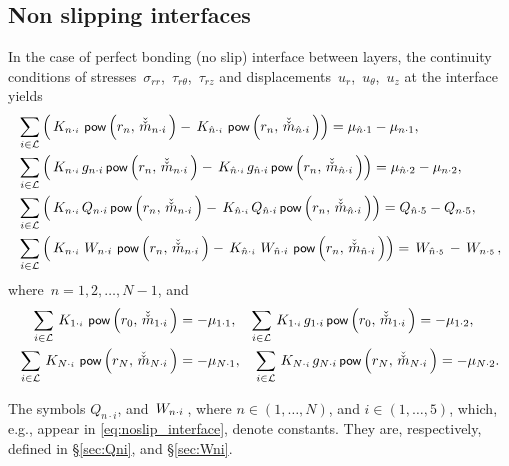 \documentclass[preprint,12pt,times]{elsarticle}
\newcommand{\plus}[1]{\hat{#1}}
\newcommand{\minus}[1]{\check{#1}}
\newcommand{\minusminus}[1]{\minus{\minus{#1}}}
\numberwithin{equation}{section}
\newcommand{\pr}[1]{\left( #1 \right)}
\newcommand{\p}{\,\textsf{\small pow}}
\newcommand{\msubmm}[2]{
\IfEqCase{#2}{
      {i}{\, \minusminus{m}_{#1\cdot #2}\,}%
  }[\,\minusminus{m}_{#1\cdot {\scriptscriptstyle #2}}\,]}
\newcommand{\gsub}[2]{g_{#1\cdot #2}}
\newcommand{\Qsub}[2]{Q_{#1\cdot #2}}
\newcommand{\Wsub}[2]{
\IfEqCase{#2}{
      {i}{\, W_{#1\cdot #2}\,}%
  }[\,W_{#1\cdot {\scriptscriptstyle #2}}\,]}
\newcommand{\musub}[2]{\mu_{#1\cdot #2}}
\newcommand{\Ksub}[2]{\,K_{ {#1}\cdot {\scriptscriptstyle #2}}\,}
\newcommand{\infive}{\in(1,\ldots,5)}
\newcommand{\inN}{\in(1,\ldots,N)}
\renewcommand{\>}{$\Rightarrow$}
\begin{document}
\subsection{Non slipping interfaces}

In the case of perfect bonding (no slip) interface between layers, the continuity conditions of stresses~$\sigma_{rr}$,~$\tau_{r\theta}$,~$\tau_{rz}$ and displacements~$u_{r}$,~$u_{\theta}$,~$u_z$ at the interface yields
\begin{subequations}
	\begin{align}
	& \sum_{i \in \mathcal{L}} \left( \Ksub{n}{i} \p\pr{r_{n},\msubmm{n}{i}} - \Ksub{\plus{n}}{i} \p\pr{r_{n},\msubmm{\plus{n}}{i}} \right) = \musub{\plus{n}}{1}
  - \musub{n}{1}, \\
	& \sum_{i \in \mathcal{L}} \left( \Ksub{n}{i} \gsub{n}{i} \p\pr{r_{n},\msubmm{n}{i}} - \Ksub{\plus{n}}{i} \gsub{\plus{n}}{i} \p\pr{r_{n},\msubmm{\plus{n}}{i}} \right) = \musub{\plus{n}}{2} - \musub{n}{2}, \\
	& \sum_{i \in \mathcal{L}} \left( \Ksub{n}{i} \Qsub{n}{i} \p\pr{r_{n},\msubmm{n}{i}} - \Ksub{\plus{n}}{i} \Qsub{\plus{n}}{i} \p\pr{r_{n},\msubmm{\plus{n}}{i}} \right) = \Qsub{\plus{n}}{5} - \Qsub{n}{5}, \\
	& \sum_{i \in \mathcal{L}} \left( \Ksub{n}{i} \Wsub{n}{i} \p\pr{r_{n},\msubmm{n}{i}} - \Ksub{\plus{n}}{i} \Wsub{\plus{n}}{i} \p\pr{r_{n},\msubmm{\plus{n}}{i}} \right) = \Wsub{\plus{n}}{5} - \Wsub{n}{5},
	\end{align}
	\label{eq:noslip_interface}
\end{subequations}
where~$n = 1,2,\dots,N-1$, and
\begin{subequations}
	\begin{align}
	\sum_{i \in \mathcal{L}} \Ksub{1}{i} \p\pr{r_{0},\msubmm{1}{i}} & = -\musub{1}{1}, \quad
	\sum_{i \in \mathcal{L}} \Ksub{1}{i} \gsub{1}{i} \p\pr{r_{0},\msubmm{1}{i}} = -\musub{1}{2},\\
	\sum_{i \in \mathcal{L}} \Ksub{N}{i} \p\pr{r_{N},\msubmm{N}{i}} & = -\musub{N}{1}, \quad
	\sum_{i \in \mathcal{L}} \Ksub{N}{i} \gsub{N}{i} \p\pr{r_{N},\msubmm{N}{i}} = -\musub{N}{2}.
	\end{align}
	\label{eq:boundary}
\end{subequations}


The symbols $\Qsub{n}{i}$, and $\Wsub{n}{i}$, where $n\inN$, and $i\infive$, which, e.g., appear in \eqref{eq:noslip_interface}, denote constants. They are, respectively, defined in \S\ref{sec:Qni}, and \S\ref{sec:Wni}.
\end{document}
